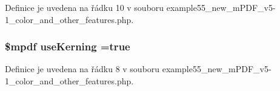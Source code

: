 Definice je uvedena na řádku 10 v souboru example55\-\_\-new\-\_\-m\-P\-D\-F\-\_\-v5-\/1\-\_\-color\-\_\-and\-\_\-other\-\_\-features.\-php.

\hypertarget{example55__new__m_p_d_f__v5-1__color__and__other__features_8php_aee7b0f8606c1b4849e0166a4a335069d}{
\subsubsection[{use\-Kerning}]{\setlength{\rightskip}{0pt plus 5cm}\$mpdf use\-Kerning =true}}\label{example55__new__m_p_d_f__v5-1__color__and__other__features_8php_aee7b0f8606c1b4849e0166a4a335069d}


Definice je uvedena na řádku 8 v souboru example55\-\_\-new\-\_\-m\-P\-D\-F\-\_\-v5-\/1\-\_\-color\-\_\-and\-\_\-other\-\_\-features.\-php.

